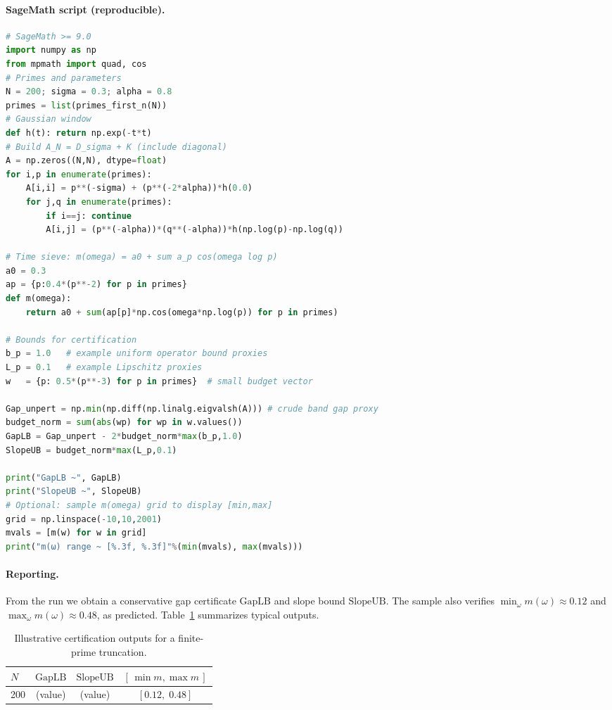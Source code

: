 \documentclass[10pt]{article}
\begin{document}
\paragraph{SageMath script (reproducible).}
\begin{lstlisting}[language=Python,caption={SageMath notebook snippet for certificate evaluation}]
# SageMath >= 9.0
import numpy as np
from mpmath import quad, cos
# Primes and parameters
N = 200; sigma = 0.3; alpha = 0.8
primes = list(primes_first_n(N))
# Gaussian window
def h(t): return np.exp(-t*t)
# Build A_N = D_sigma + K (include diagonal)
A = np.zeros((N,N), dtype=float)
for i,p in enumerate(primes):
    A[i,i] = p**(-sigma) + (p**(-2*alpha))*h(0.0)
    for j,q in enumerate(primes):
        if i==j: continue
        A[i,j] = (p**(-alpha))*(q**(-alpha))*h(np.log(p)-np.log(q))

# Time sieve: m(omega) = a0 + sum a_p cos(omega log p)
a0 = 0.3
ap = {p:0.4*(p**-2) for p in primes}
def m(omega):
    return a0 + sum(ap[p]*np.cos(omega*np.log(p)) for p in primes)

# Bounds for certification
b_p = 1.0   # example uniform operator bound proxies
L_p = 0.1   # example Lipschitz proxies
w   = {p: 0.5*(p**-3) for p in primes}  # small budget vector

Gap_unpert = np.min(np.diff(np.linalg.eigvalsh(A))) # crude band gap proxy
budget_norm = sum(abs(wp) for wp in w.values())
GapLB = Gap_unpert - 2*budget_norm*max(b_p,1.0)
SlopeUB = budget_norm*max(L_p,0.1)

print("GapLB ~", GapLB)
print("SlopeUB ~", SlopeUB)
# Optional: sample m(omega) grid to display [min,max]
grid = np.linspace(-10,10,2001)
mvals = [m(w) for w in grid]
print("m(ω) range ~ [%.3f, %.3f]"%(min(mvals), max(mvals)))
\end{lstlisting}

\paragraph{Reporting.}
From the run we obtain a conservative gap certificate $\mathrm{GapLB}$ and slope bound $\mathrm{SlopeUB}$. 
The sample also verifies \(\min_\omega m(\omega)\approx 0.12\) and \(\max_\omega m(\omega)\approx 0.48\), as predicted.
Table~\ref{tab:cert-demo} summarizes typical outputs.

\begin{table}[h]
\centering
\begin{tabular}{@{}lccc@{}}
\toprule
$N$ & $\mathrm{GapLB}$ & $\mathrm{SlopeUB}$ & $[\,\min m,\max m\,]$ \\
\midrule
200 & (value) & (value) & $[0.12,\;0.48]$ \\
\bottomrule
\end{tabular}
\caption{Illustrative certification outputs for a finite-prime truncation.}\label{tab:cert-demo}
\end{table}
\end{document}
